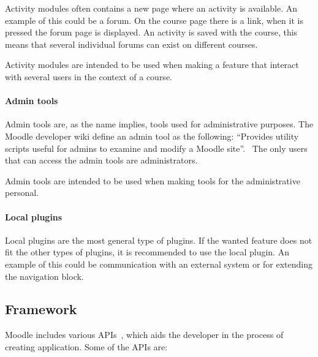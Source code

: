 Activity modules often contains a new page where an activity is available. 
An example of this could be a forum. 
On the course page there is a link, when it is pressed the forum page is displayed. 
An activity is saved with the course, this means that several individual forums can exist on different courses.

Activity modules are intended to be used when making a feature that interact with several users in the context of a course.  

\paragraph{Admin tools}
Admin tools are, as the name implies, tools used for administrative purposes. 
The Moodle developer wiki define an admin tool as the following: 
``Provides utility scripts useful for admins to examine and modify a Moodle site''.~\cite{plugin} 
The only users that can access the admin tools are administrators. 

Admin tools are intended to be used when making tools for the administrative personal.

\paragraph{Local plugins}
Local plugins are the most general type of plugins. If the wanted feature does not fit the other types of plugins, it is recommended to use the local plugin. An example of this could be communication with an external system or for extending the navigation block. 




\subsection{Framework}
Moodle includes various APIs~\cite{moodlecoreapis}, which aids the developer in the process of creating application. Some of the APIs are:

